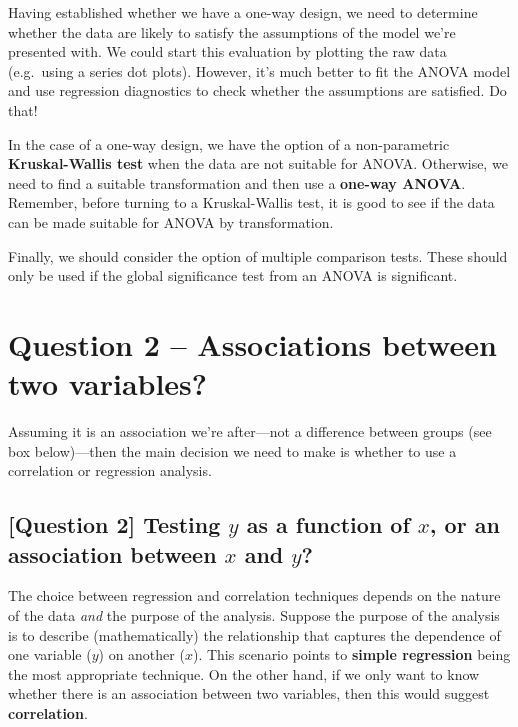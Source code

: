 \documentclass[
]{book}
\begin{document}
Having established whether we have a one-way design, we need to determine whether the data are likely to satisfy the assumptions of the model we're presented with. We could start this evaluation by plotting the raw data (e.g.~using a series dot plots). However, it's much better to fit the ANOVA model and use regression diagnostics to check whether the assumptions are satisfied. Do that!

In the case of a one-way design, we have the option of a non-parametric \textbf{Kruskal-Wallis test} when the data are not suitable for ANOVA. Otherwise, we need to find a suitable transformation and then use a \textbf{one-way ANOVA}. Remember, before turning to a Kruskal-Wallis test, it is good to see if the data can be made suitable for ANOVA by transformation.

Finally, we should consider the option of multiple comparison tests. These should only be used if the global significance test from an ANOVA is significant.

\hypertarget{qu2}{%
\section{Question 2 -- Associations between two variables?}\label{qu2}}

Assuming it is an association we're after---not a difference between groups (see box below)---then the main decision we need to make is whether to use a correlation or regression analysis.

\hypertarget{question-2-testing-y-as-a-function-of-x-or-an-association-between-x-and-y}{%
\subsection{\texorpdfstring{{[}Question 2{]} Testing \(y\) as a function of \(x\), or an association between \(x\) and \(y\)?}{{[}Question 2{]} Testing y as a function of x, or an association between x and y?}}\label{question-2-testing-y-as-a-function-of-x-or-an-association-between-x-and-y}}

The choice between regression and correlation techniques depends on the nature of the data \emph{and} the purpose of the analysis. Suppose the purpose of the analysis is to describe (mathematically) the relationship that captures the dependence of one variable (\(y\)) on another (\(x\)). This scenario points to \textbf{simple regression} being the most appropriate technique. On the other hand, if we only want to know whether there is an association between two variables, then this would suggest \textbf{correlation}.
\end{document}
